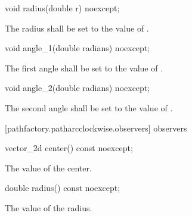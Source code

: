\begin{itemdecl}
    void radius(double r) noexcept;
\end{itemdecl}
\begin{itemdescr}
	\pnum
	\effects
	The radius shall be set to the value of .
\end{itemdescr}

\begin{itemdecl}
    void angle_1(double radians) noexcept;
\end{itemdecl}
\begin{itemdescr}
	\pnum
	\effects
	The first angle shall be set to the value of .
\end{itemdescr}

\begin{itemdecl}
    void angle_2(double radians) noexcept;
\end{itemdecl}
\begin{itemdescr}
	\pnum
	\effects
	The second angle shall be set to the value of .
\end{itemdescr}

 [pathfactory.patharcclockwise.observers]{ observers}

\begin{itemdecl}
    vector_2d center() const noexcept;
\end{itemdecl}
\begin{itemdescr}
	\pnum
	\returns
	The value of the center.
\end{itemdescr}

\begin{itemdecl}
    double radius() const noexcept;
\end{itemdecl}
\begin{itemdescr}
	\pnum
	\returns
	The value of the radius.
\end{itemdescr}

